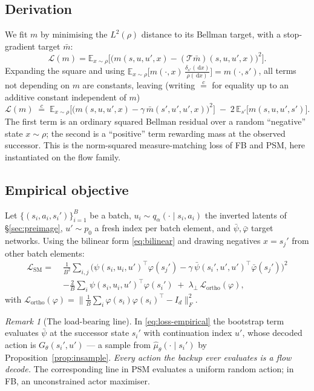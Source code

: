\documentclass[11pt]{article}
\theoremstyle{plain}
\theoremstyle{definition}
\theoremstyle{remark}
\newtheorem{remark}[lemma]{Remark}
\newcommand{\E}{\mathbb E}
\newcommand{\1}{\mathbf 1}
\newcommand{\dd}{\,\mathrm d}
\newcommand{\Gth}{G_\theta}
\newcommand{\muhat}{\hat\mu_\theta}
\begin{document}
\subsection{Derivation}

We fit $m$ by minimising the $L^2(\rho)$ distance to its Bellman target, with a stop-gradient
target $\bar m$:
\[
  \mathcal L(m)=\E_{x\sim\rho}\Big[\big(m(s,u,u',x)-(\mathcal T\bar m)(s,u,u',x)\big)^2\Big].
\]
Expanding the square and using
$\E_{x\sim\rho}\big[m(\cdot,x)\,\tfrac{\delta_{s'}(\dd x)}{\rho(\dd x)}\big]=m(\cdot,s')$,
all terms not depending on $m$ are constants, leaving (writing $\overset{c}{=}$ for
equality up to an additive constant independent of $m$)
\begin{equation}
\label{eq:loss-abstract}
  \mathcal L(m)\;\overset{c}{=}\;
  \E_{x\sim\rho}\Big[\big(m(s,u,u',x)-\gamma\,\bar m(s',u',u',x)\big)^2\Big]
  \;-\;2\,\E_{s'}\big[m(s,u,u',s')\big].
\end{equation}
The first term is an ordinary squared Bellman residual over a random ``negative'' state
$x\sim\rho$; the second is a ``positive'' term rewarding mass at the observed successor.
This is the norm-squared measure-matching loss of FB and PSM, here instantiated on the
flow family.

\subsection{Empirical objective}

Let $\{(s_i,a_i,s_i')\}_{i=1}^B$ be a batch, $u_i\sim q_\alpha(\cdot\mid s_i,a_i)$ the
inverted latents of \S\ref{sec:preimage}, $u'\sim p_0$ a fresh index per batch element, and
$\bar\psi,\bar\varphi$ target networks. Using the bilinear form \eqref{eq:bilinear} and
drawing negatives $x=s_j'$ from other batch elements:
\begin{equation}
\label{eq:loss-empirical}
\boxed{\;
\begin{aligned}
  \mathcal L_{\mathrm{SM}}
  =\;&\frac{1}{B^2}\sum_{i,j}\Big(\psi(s_i,u_i,u')^\top\varphi(s_j')
      -\gamma\,\bar\psi(s_i',u',u')^\top\bar\varphi(s_j')\Big)^2 \\
   &-\frac{2}{B}\sum_i \psi(s_i,u_i,u')^\top\varphi(s_i')
   \;+\;\lambda_\perp\,\mathcal L_{\mathrm{ortho}}(\varphi),
\end{aligned}\;}
\end{equation}
with
$\mathcal L_{\mathrm{ortho}}(\varphi)=
\big\|\tfrac1B\sum_i\varphi(s_i)\varphi(s_i)^\top-I_d\big\|_F^2$.

\begin{remark}[The load-bearing line]
\label{rem:load-bearing}
In \eqref{eq:loss-empirical} the bootstrap term evaluates $\bar\psi$ at the successor state
$s_i'$ with continuation index $u'$, whose decoded action is $\Gth(s_i',u')$ --- a sample
from $\muhat(\cdot\mid s_i')$ by Proposition~\ref{prop:insample}. \emph{Every action the
backup ever evaluates is a flow decode.} The corresponding line in PSM evaluates a uniform
random action; in FB, an unconstrained actor maximiser.
\end{remark}
\end{document}

